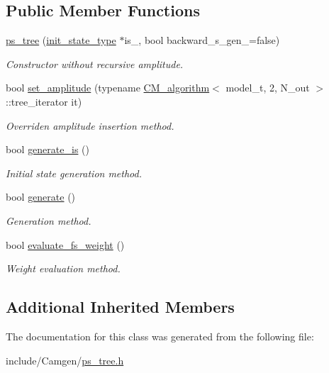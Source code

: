 \subsection*{Public Member Functions}
\begin{DoxyCompactItemize}
\item 
\hypertarget{a00457_a18e3de29354c866458c7a8c8e55d8c2e}{}\hyperlink{a00457_a18e3de29354c866458c7a8c8e55d8c2e}{ps\+\_\+tree} (\hyperlink{a00308}{init\+\_\+state\+\_\+type} $\ast$is\+\_\+, bool backward\+\_\+s\+\_\+gen\+\_\+=false)\label{a00457_a18e3de29354c866458c7a8c8e55d8c2e}

\begin{DoxyCompactList}\small\item\em Constructor without recursive amplitude. \end{DoxyCompactList}\item 
\hypertarget{a00457_a03d5948935e8859367e290bdf2990c24}{}bool \hyperlink{a00457_a03d5948935e8859367e290bdf2990c24}{set\+\_\+amplitude} (typename \hyperlink{a00065}{C\+M\+\_\+algorithm}$<$ model\+\_\+t, 2, N\+\_\+out $>$\+::tree\+\_\+iterator it)\label{a00457_a03d5948935e8859367e290bdf2990c24}

\begin{DoxyCompactList}\small\item\em Overriden amplitude insertion method. \end{DoxyCompactList}\item 
\hypertarget{a00457_ae385cb3fff5b6daa05811a172530de14}{}bool \hyperlink{a00457_ae385cb3fff5b6daa05811a172530de14}{generate\+\_\+is} ()\label{a00457_ae385cb3fff5b6daa05811a172530de14}

\begin{DoxyCompactList}\small\item\em Initial state generation method. \end{DoxyCompactList}\item 
\hypertarget{a00457_a63ea6d14274ce4584a8657c6d62d8a1e}{}bool \hyperlink{a00457_a63ea6d14274ce4584a8657c6d62d8a1e}{generate} ()\label{a00457_a63ea6d14274ce4584a8657c6d62d8a1e}

\begin{DoxyCompactList}\small\item\em Generation method. \end{DoxyCompactList}\item 
\hypertarget{a00457_a9d2d780a4d56a2582515771a56696018}{}bool \hyperlink{a00457_a9d2d780a4d56a2582515771a56696018}{evaluate\+\_\+fs\+\_\+weight} ()\label{a00457_a9d2d780a4d56a2582515771a56696018}

\begin{DoxyCompactList}\small\item\em Weight evaluation method. \end{DoxyCompactList}\end{DoxyCompactItemize}
\subsection*{Additional Inherited Members}


The documentation for this class was generated from the following file\+:\begin{DoxyCompactItemize}
\item 
include/\+Camgen/\hyperlink{a00744}{ps\+\_\+tree.\+h}\end{DoxyCompactItemize}

